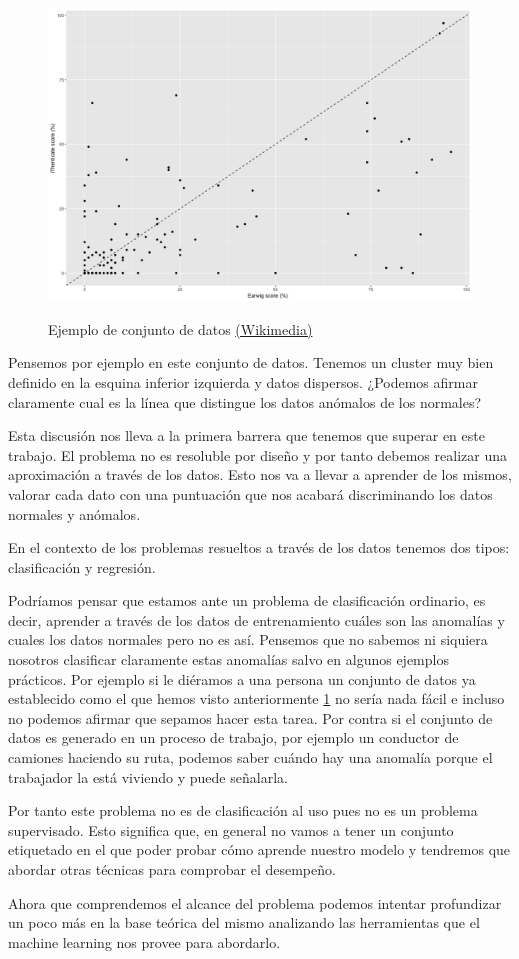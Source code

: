 \begin{figure}[!h]
	\centering
	\includegraphics[scale=0.3]{imagenes/1_introduccion}
	\label{1_introduccion}
	\caption{Ejemplo de conjunto de datos \href{https://commons.wikimedia.org/wiki/File:Earwig_ithenticate_scatterplot.png}{(Wikimedia)}}
\end{figure}

Pensemos por ejemplo en este conjunto de datos. Tenemos un cluster muy bien definido en la esquina inferior izquierda y datos dispersos. ¿Podemos afirmar claramente cual es la línea que distingue los datos anómalos de los normales? 

Esta discusión nos lleva a la primera barrera que tenemos que superar en este trabajo. El problema no es resoluble por diseño y por tanto debemos realizar una aproximación a través de los datos. Esto nos va a llevar a aprender de los mismos, valorar cada dato con una puntuación que nos acabará discriminando los datos normales y anómalos.

En el contexto de los problemas resueltos a través de los datos tenemos dos tipos: clasificación y regresión. 

Podríamos pensar que estamos ante un problema de clasificación ordinario, es decir, aprender a través de los datos de entrenamiento cuáles son las anomalías y cuales los datos normales pero no es así. Pensemos que no sabemos ni siquiera nosotros clasificar claramente estas anomalías salvo en algunos ejemplos prácticos. Por ejemplo si le diéramos a una persona un conjunto de datos ya establecido como el que hemos visto anteriormente \ref{1_introduccion} no sería nada fácil e incluso no podemos afirmar que sepamos hacer esta tarea. Por contra si el conjunto de datos es generado en un proceso de trabajo, por ejemplo un conductor de camiones haciendo su ruta, podemos saber cuándo hay una anomalía porque el trabajador la está viviendo y puede señalarla.

Por tanto este problema no es de clasificación al uso pues no es un problema supervisado. Esto significa que, en general no vamos a tener un conjunto etiquetado en el que poder probar cómo aprende nuestro modelo y tendremos que abordar otras técnicas para comprobar el desempeño.

Ahora que comprendemos el alcance del problema podemos intentar profundizar un poco más en la base teórica del mismo analizando las herramientas que el machine learning nos provee para abordarlo.